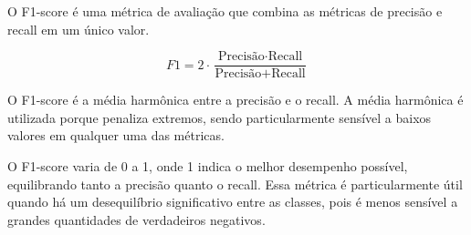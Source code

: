 O F1-score é uma métrica de avaliação que combina as métricas de precisão e recall em um único valor. 

\begin{equation}
  F1 = 2 \cdot \frac{\text{Precisão} \cdot \text{Recall}}{\text{Precisão} + \text{Recall}}
\end{equation}

O F1-score é a média harmônica entre a precisão e o recall. A média harmônica é utilizada porque penaliza extremos, 
sendo particularmente sensível a baixos valores em qualquer uma das métricas.

O F1-score varia de 0 a 1, onde 1 indica o melhor desempenho possível, equilibrando tanto a precisão quanto o recall.
Essa métrica é particularmente útil quando há um desequilíbrio significativo entre as classes, 
pois é menos sensível a grandes quantidades de verdadeiros negativos.